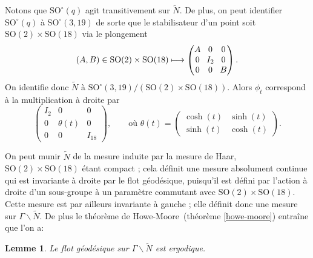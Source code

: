 \documentclass[JEP,XML,SOM,Unicode,francais,published]{cedram}
\newcommand\mto{\mathchoice{\longmapsto}{\mapsto}{\mapsto}{\mapsto}}
\newcommand{\SO}{\mathrm{SO}}
\newtheorem{lem}[thm]{Lemme}
\theoremstyle{definition}
\begin{document}
Notons que $\SO^\circ(q)$ agit transitivement sur $\tilde{N}$. De plus, on peut identifier $\SO^\circ(q)$ à $\SO^\circ(3, 19)$ de sorte que le stabilisateur d'un point soit $\SO(2) \times \SO(18)$ via le plongement
\[\arraycolsep3.5pt
(A, B) \in \SO(2) \times \SO(18) \mto \begin{pmatrix}A & 0 & 0 \\ 0 & I_2 & 0 \\ 0 & 0 & B\end{pmatrix}.\] On identifie donc $\tilde{N}$ à $\SO^\circ(3, 19)/(\SO(2) \times \SO(18))$.
Alors $\phi_t$ correspond à la multiplication à droite par
\[
\begin{pmatrix}I_2 & 0 & 0 \\ 0 & \theta(t) & 0 \\ 0 & 0 & I_{18}\end{pmatrix},\qquad\text{où }\theta(t) = \begin{pmatrix}\cosh(t) & \sinh(t) \\ \sinh(t) & \cosh(t)\end{pmatrix}.
\]

On peut munir $\tilde{N}$ de la mesure induite par la mesure de Haar, $\SO(2) \times \SO(18)$ étant compact ; cela définit une mesure absolument continue qui est invariante à droite par le flot géodésique, puisqu'il est défini par l'action à droite d'un sous-groupe à un paramètre commutant avec $\SO(2) \times \SO(18)$. Cette mesure est par ailleurs invariante à gauche ; elle définit donc une mesure sur $\Gamma\backslash \tilde{N}$. De plus le théorème de Howe-Moore~(théorème \ref{howe-moore}) entraîne que l'on a:
\begin{lem}Le flot géodésique sur $\Gamma\backslash \tilde{N}$ est ergodique.\end{lem}
\end{document}
